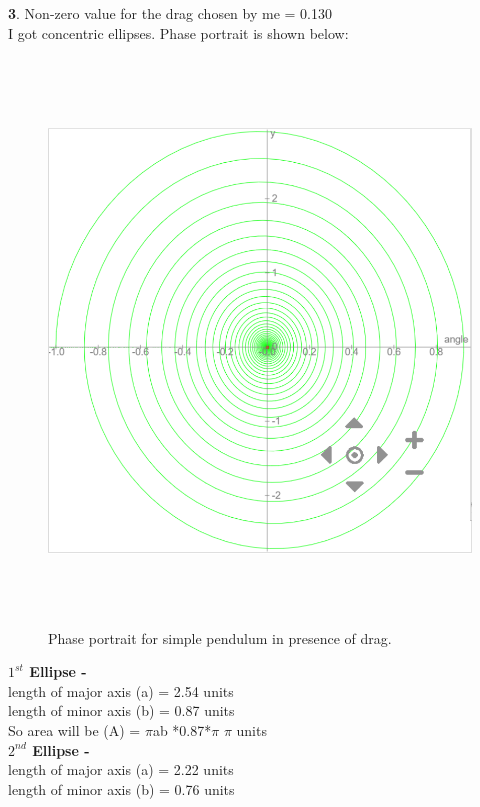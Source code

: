 \documentclass[11pt]{scrartcl} %
\begin{document}
\newpage
\textbf{3}.
Non-zero value for the drag chosen by me = 0.130 \\
I got concentric ellipses. Phase portrait is shown below:
\begin{figure}[h] %
	\centering
	\includegraphics[width=\textwidth, height=15cm]{3.PNG} %
	\caption{Phase portrait for simple pendulum in presence of drag.}
\end{figure}

\textbf{$1^{st}$ Ellipse - }\\
length of major axis (a) = 2.54 units\\
length of minor axis (b) = 0.87 units\\

So area will be (A) = $\pi$ab *0.87*$\pi$ $\pi$ units\\

\textbf{$2^{nd}$ Ellipse - }\\
length of major axis (a) = 2.22 units\\
length of minor axis (b) = 0.76 units\\
\end{document}
